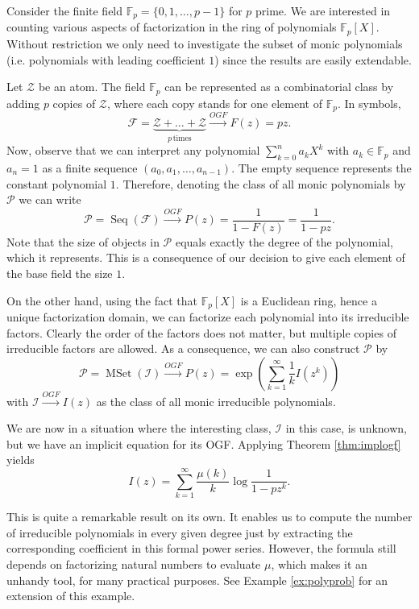 \begin{exm}
\label{ex:polys}
Consider the finite field $\mathbb{F}_p = \{ 0, 1, \dots, p-1 \}$ for $p$ prime. 
We are interested in counting various aspects of factorization in the ring of polynomials $\mathbb{F}_p[X]$.
Without restriction we only need to investigate the subset of monic polynomials (i.e. polynomials with leading coefficient $1$) since the results are easily extendable.

Let $\mathcal{Z}$ be an atom. The field $\mathbb{F}_p$ can be represented as a combinatorial class by adding $p$ copies of $\mathcal{Z}$, where each copy stands for one element of $\mathbb{F}_p$.
In symbols,
\begin{equation*}
    \mathcal{F} = \underbrace{\mathcal{Z} + \dots + \mathcal{Z}}_{p \, \text{times}} \xrightarrow{OGF} F(z) = p z.
\end{equation*}
Now, observe that we can interpret any polynomial $\sum_{k=0}^n a_k X^k$ with $a_k \in \mathbb{F}_p$ and $a_n = 1$ as a finite sequence $(a_0, a_1, \dots, a_{n-1})$. The empty sequence represents the constant polynomial $1$.
Therefore, denoting the class of all monic polynomials by $\mathcal{P}$ we can write
\begin{equation*}
    \mathcal{P} = \operatorname{Seq}(\mathcal{F}) \xrightarrow{OGF} P(z) = \frac{1}{1 - F(z)} = \frac{1}{1 - p z}.
\end{equation*}
Note that the size of objects in $\mathcal{P}$ equals exactly the degree of the polynomial, which it represents. 
This is a consequence of our decision to give each element of the base field the size $1$.

On the other hand, using the fact that $\mathbb{F}_p[X]$ is a Euclidean ring, hence a unique factorization domain, we can factorize each polynomial into its irreducible factors. 
Clearly the order of the factors does not matter, but multiple copies of irreducible factors are allowed.
As a consequence, we can also construct $\mathcal{P}$ by
\begin{equation*}
    \mathcal{P} = \operatorname{MSet}(\mathcal{I}) \xrightarrow{OGF} P(z) = \exp \left( \sum_{k=1}^\infty \frac{1}{k} I(z^k) \right)
\end{equation*}
with $\mathcal{I} \xrightarrow{OGF} I(z)$ as the class of all monic irreducible polynomials.

We are now in a situation where the interesting class, $\mathcal{I}$ in this case, is unknown, but we have an implicit equation for its OGF.
Applying Theorem \ref{thm:implogf} yields
\begin{equation*}
    I(z) = \sum_{k = 1}^\infty \frac{\mu (k)}{k} \log \frac{1}{1 - p z^k}.
\end{equation*}

This is quite a remarkable result on its own. It enables us to compute the number of irreducible polynomials in every given degree just by extracting the corresponding coefficient in this formal power series.
However, the formula still depends on factorizing natural numbers to evaluate $\mu$, which makes it an unhandy tool, for many practical purposes.
See Example \ref{ex:polyprob} for an extension of this example.
\end{exm}


